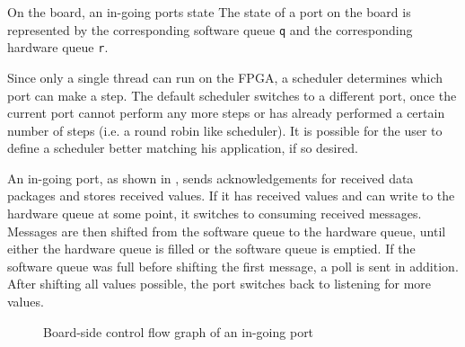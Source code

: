 \documentclass{report}
\begin{document}
On the board, an in-going ports state The state of a port on the board is represented by the corresponding software queue \texttt{q} and the corresponding hardware queue \texttt{r}.

Since only a single thread can run on the FPGA, a scheduler determines which port can make a step. The default scheduler switches to a different port, once the current port cannot perform any more steps or has already performed a certain number of steps (i.e. a round robin like scheduler). It is possible for the user to define a scheduler better matching his application, if so desired.

An in-going port, as shown in , sends acknowledgements for received data packages and stores received values. If it has received values and can write to the hardware queue at some point, it switches to consuming received messages. Messages are then shifted from the software queue to the hardware queue, until either the hardware queue is filled or the software queue is emptied. If the software queue was full before shifting the first message, a poll is sent in addition. After shifting all values possible, the port switches back to listening for more values. 

\begin{figure}[h]
\centering
{}
\label{fig:cfg:boardIn}
\caption{Board-side control flow graph of an in-going port}
\end{figure}
\end{document}
